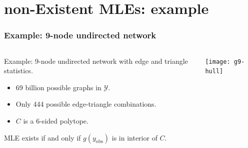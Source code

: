\documentclass[ 10pt]{beamer}
\DeclareMathOperator{\rint}{rint}
\def\YY{{\mathcal Y}}
\newcommand{\yobs}{y_{\text{obs}}}
\begin{document}
\section{non-Existent MLEs: example}
\frame
{
  \frametitle{Example: 9-node undirected network}  

\begin{columns}[T]
\begin{column}[T]{0.4\textwidth}

{
Example: 9-node undirected network with edge and triangle statistics.
\vspace{1mm}

\begin{itemize}
\item 69 billion possible graphs in $\YY$.
\item Only 444 possible edge-triangle combinations.
\item $C$ is a 6-sided polytope.
\end{itemize}
\vspace{2mm}

MLE exists if and only if
$g(\yobs)$ is in interior of $C$.
\vspace{4mm}



}
\end{column}
\begin{column}[T]{0.6\textwidth}
\texttt{[image: g9-hull]}
\end{column}
\end{columns}
}

\end{document}
